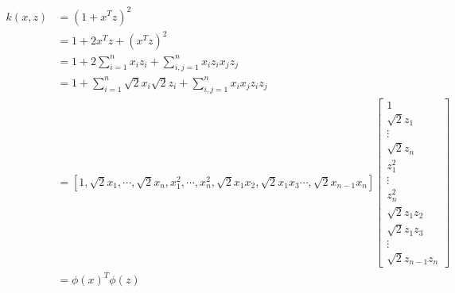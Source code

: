 \documentclass[]{subfiles}
\begin{document}
\begin{align*}
k(x, z)
& = (1 + x^Tz)^2 \\
& = 1 + 2 x^T z + (x^T z)^2 \\
& = 1 + 2 \sum_{i=1}^n x_i z_i + \sum_{i,j=1}^n x_i z_i x_j z_j \\
& = 1 + \sum_{i=1}^n \sqrt{2} x_i \sqrt{2} z_i
    + \sum_{i,j=1}^n x_i x_j z_i z_j \\
& = [1, \sqrt{2}x_1, \cdots, \sqrt{2}x_n, x_1^2, \cdots, x_n^2,
    \sqrt{2}x_1 x_2, \sqrt{2}x_1 x_3 \cdots, \sqrt{2}x_{n-1}x_{n}]
    \left[
        \begin{array}{c}
            1 \\
            \sqrt{2}z_1 \\
            \vdots \\
            \sqrt{2}z_n \\
            z_1^2 \\
            \vdots \\
            z_n^2 \\
            \sqrt{2}z_1 z_2 \\
            \sqrt{2}z_1 z_3 \\
            \vdots \\
            \sqrt{2}z_{n-1}z_{n}
        \end{array}
    \right] \\
& = \phi(x)^T \phi(z)
\end{align*}
\end{document}
